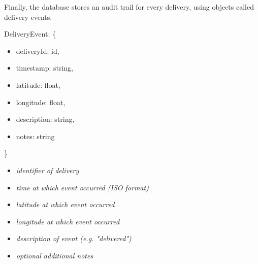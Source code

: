 Finally, the database stores an audit trail for every delivery, using objects called delivery events.

\begin{minipage}{6.5cm}
DeliveryEvent: \{
\begin{itemize}
    \itemsep-0.5em
    \item[] deliveryId: id,
    \item[] timestamp: string,
    \item[] latitude: float,
    \item[] longitude: float,
    \item[] description: string,
    \item[] notes: string
\end{itemize}
\}
\end{minipage}
\begin{minipage}{10cm}
\hspace{1cm}
\begin{itemize}
    \itemsep-0.5em
    \item[] \textit{identifier of delivery}
    \item[] \textit{time at which event occurred (ISO format)}
    \item[] \textit{latitude at which event occurred}
    \item[] \textit{longitude at which event occurred}
    \item[] \textit{description of event (e.g. "delivered")}
    \item[] \textit{optional additional notes}
\end{itemize}
\hspace{1cm}
\end{minipage}
